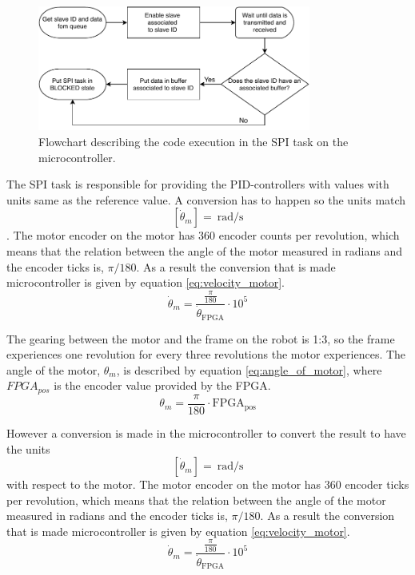 \documentclass[../../main.tex]{subfiles}
\begin{document}
\begin{figure}[H]
    \centering
    \includegraphics[width=0.8\textwidth]{Sections/System_Implementation/Images/SPIFlowchart.pdf}
    \caption{Flowchart describing the code execution in the SPI task on the microcontroller.}
    \label{fig:SPIFlowchart}
\end{figure}

The SPI task is responsible for providing the PID-controllers with values with units same as the reference value. A conversion has to happen so the units match \[ \left[ \dot{\theta}_m \right] = \SI{}{\radian \per \second } \]. The motor encoder on the motor has 360 encoder counts per revolution, which means that the relation between the angle of the motor measured in radians and the encoder ticks is, $\pi / 180$. As a result the conversion that is made microcontroller is given by equation \ref{eq:velocity_motor}.
\begin{equation}\label{eq:velocity_motor}
    \dot{\theta}_{m} = \frac{\frac{\pi}{180}}{ \dot{\theta}_{\mathrm{FPGA}} }\cdot 10^{5}
\end{equation}


The gearing between the motor and the frame on the robot is 1:3, so the frame experiences one revolution for every three revolutions the motor experiences. The angle of the motor, $ \theta_{m} $, is described by equation \ref{eq:angle_of_motor}, where $FPGA_{pos}$ is the encoder value provided by the FPGA.
\begin{equation}\label{eq:angle_of_motor}
     \theta_{m} = \frac{\pi}{180} \cdot \mathrm{FPGA_{pos}}
\end{equation}


However a conversion is made in the microcontroller to convert the result to have the units \[ \left[ \dot{\theta}_m \right] = \SI{}{\radian \per \second } \] with respect to the motor. The motor encoder on the motor has 360 encoder ticks per revolution, which means that the relation between the angle of the motor measured in radians and the encoder ticks is, $\pi / 180$. As a result the conversion that is made microcontroller is given by equation \ref{eq:velocity_motor}.
\begin{equation}\label{eq:velocity_motor}
    \dot{\theta}_{m} = \frac{\frac{\pi}{180}}{ \dot{\theta}_{\mathrm{FPGA}} }\cdot 10^{5}
\end{equation}
\end{document}
